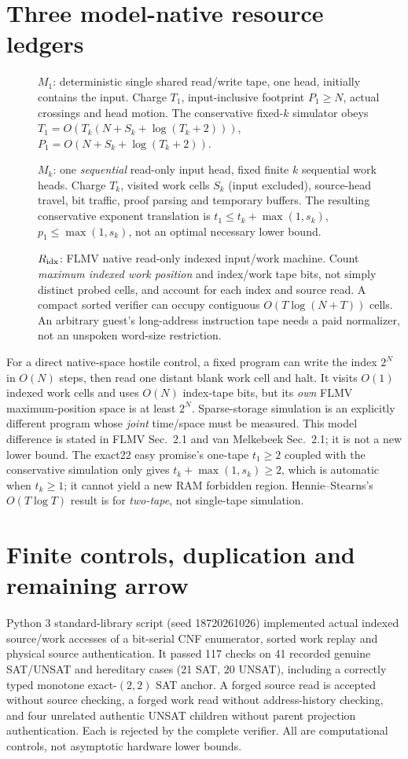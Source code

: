 \documentclass[11pt]{article}
\begin{document}
\section{Three model-native resource ledgers}
\begin{description}
\item[] $M_1$: deterministic single shared read/write tape, one head, initially contains the input. Charge $T_1$, input-inclusive footprint $P_1\ge N$, actual crossings and head motion. The conservative fixed-$k$ simulator obeys $T_1=O(T_k(N+S_k+\log(T_k+2)))$, $P_1=O(N+S_k+\log(T_k+2))$.
\item[] $M_k$: one \emph{sequential} read-only input head, fixed finite $k$ sequential work heads. Charge $T_k$, visited work cells $S_k$ (input excluded), source-head travel, bit traffic, proof parsing and temporary buffers. The resulting conservative exponent translation is $t_1\le t_k+\max(1,s_k)$, $p_1\le\max(1,s_k)$, not an optimal necessary lower bound.
\item[] $R_{\rm idx}$: FLMV native read-only indexed input/work machine. Count \emph{maximum indexed work position} and index/work tape bits, not simply distinct probed cells, and account for each index and source read. A compact sorted verifier can occupy contiguous $O(T\log(N+T))$ cells. An arbitrary guest's long-address instruction tape needs a paid normalizer, not an unspoken word-size restriction.
\end{description}
For a direct native-space hostile control, a fixed program can write the index $2^N$ in $O(N)$ steps, then read one distant blank work cell and halt. It visits $O(1)$ indexed work cells and uses $O(N)$ index-tape bits, but its \emph{own} FLMV maximum-position space is at least $2^N$. Sparse-storage simulation is an explicitly different program whose \emph{joint} time/space must be measured. This model difference is stated in FLMV Sec.~2.1 and van Melkebeek Sec.~2.1; it is not a new lower bound.
The exact22 easy promise's one-tape $t_1\ge2$ coupled with the conservative simulation only gives $t_k+\max(1,s_k)\ge2$, which is automatic when $t_k\ge1$; it cannot yield a new RAM forbidden region. Hennie--Stearns's $O(T\log T)$ result is for \emph{two-tape}, not single-tape simulation.

\section{Finite controls, duplication and remaining arrow}
Python 3 standard-library script (seed 18720261026) implemented actual indexed source/work accesses of a bit-serial CNF enumerator, sorted work replay and physical source authentication. It passed 117 checks on 41 recorded genuine SAT/UNSAT and hereditary cases (21 SAT, 20 UNSAT), including a correctly typed monotone exact-$(2,2)$ SAT anchor. A forged source read is accepted without source checking, a forged work read without address-history checking, and four unrelated authentic UNSAT children without parent projection authentication. Each is rejected by the complete verifier. All are computational controls, not asymptotic hardware lower bounds.
\end{document}
